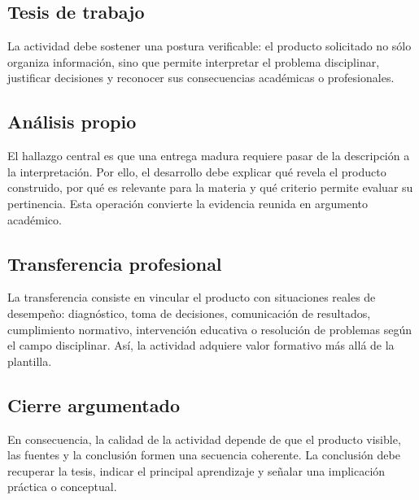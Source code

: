 \documentclass[
	spanish,
	letterpaper, oneside
]{article}
\begin{document}
\subsection*{Tesis de trabajo}
La actividad debe sostener una postura verificable: el producto solicitado no sólo organiza información, sino que permite interpretar el problema disciplinar, justificar decisiones y reconocer sus consecuencias académicas o profesionales.

\subsection*{Análisis propio}
El hallazgo central es que una entrega madura requiere pasar de la descripción a la interpretación. Por ello, el desarrollo debe explicar qué revela el producto construido, por qué es relevante para la materia y qué criterio permite evaluar su pertinencia. Esta operación convierte la evidencia reunida en argumento académico.

\subsection*{Transferencia profesional}
La transferencia consiste en vincular el producto con situaciones reales de desempeño: diagnóstico, toma de decisiones, comunicación de resultados, cumplimiento normativo, intervención educativa o resolución de problemas según el campo disciplinar. Así, la actividad adquiere valor formativo más allá de la plantilla.

\subsection*{Cierre argumentado}
En consecuencia, la calidad de la actividad depende de que el producto visible, las fuentes y la conclusión formen una secuencia coherente. La conclusión debe recuperar la tesis, indicar el principal aprendizaje y señalar una implicación práctica o conceptual.

\end{document}
